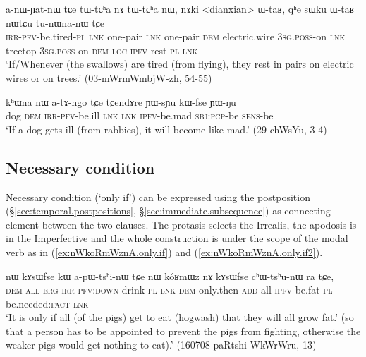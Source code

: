 \begin{exe}
\ex \label{ex:anWYatnW.tCe}
 \gll a-nɯ-ɲat-nɯ tɕe tɯ-tɕʰa nɤ tɯ-tɕʰa nɯ, nɤki <dianxian> ɯ-taʁ,  qʰe sɯku ɯ-taʁ nɯtɕu tu-nɯna-nɯ tɕe \\
 \textsc{irr}-\textsc{pfv}-be.tired-\textsc{pl} \textsc{lnk} one-pair \textsc{lnk} one-pair \textsc{dem} electric.wire \textsc{3sg}.\textsc{poss}-on \textsc{lnk} treetop \textsc{3sg}.\textsc{poss}-on \textsc{dem} \textsc{loc} \textsc{ipfv}-rest-\textsc{pl} \textsc{lnk} \\
\glt `If/Whenever  (the swallows) are tired (from flying), they rest in pairs on electric wires or on trees.' (03-mWrmWmbjW-zh, 54-55)
\end{exe}


\begin{exe}
\ex \label{ex:atAngo.tCe}
 \gll kʰɯna nɯ a-tɤ-ngo tɕe tɕendɤre ɲɯ-sɲu kɯ-fse ɲɯ-ŋu \\
 dog \textsc{dem} \textsc{irr}-\textsc{pfv}-be.ill \textsc{lnk} \textsc{lnk} \textsc{ipfv}-be.mad \textsc{sbj}:\textsc{pcp}-be \textsc{sens}-be \\
\glt `If a dog gets ill (from rabbies), it will become like mad.' (29-chWsYu, 3-4)
\end{exe}

 
 
\subsection{Necessary condition} \label{sec:only.if}
Necessary condition (`only if') can be expressed using the postposition  (§\ref{sec:temporal.postpositions}, §\ref{sec:immediate.subsequence}) as connecting element between the two clauses. The protasis selects the Irrealis, the apodosis is in the Imperfective and the whole construction is under the scope of the modal verb  as in  (\ref{ex:nWkoRmWznA.only.if}) and (\ref{ex:nWkoRmWznA.only.if2}).

\begin{exe}
	\ex \label{ex:nWkoRmWznA.only.if}
	\gll nɯ kɤsɯfse kɯ a-pɯ-tsʰi-nɯ tɕe nɯ 	kóʁmɯz nɤ kɤsɯfse cʰɯ-tsʰu-nɯ ra tɕe,  \\
	\textsc{dem} \textsc{all} \textsc{erg} \textsc{irr}-\textsc{pfv}:\textsc{down}-drink-\textsc{pl} \textsc{lnk} \textsc{dem}  only.then \textsc{add} all \textsc{ipfv}-be.fat-\textsc{pl} be.needed:\textsc{fact} \textsc{lnk} \\
	\glt `It is only if all (of the pigs) get to eat (hogwash) that they will all grow fat.' (so that a person has to be appointed to prevent the pigs from fighting, otherwise the weaker pigs would get nothing to eat).' (160708 paRtshi WkWrWru, 13)
\end{exe}

